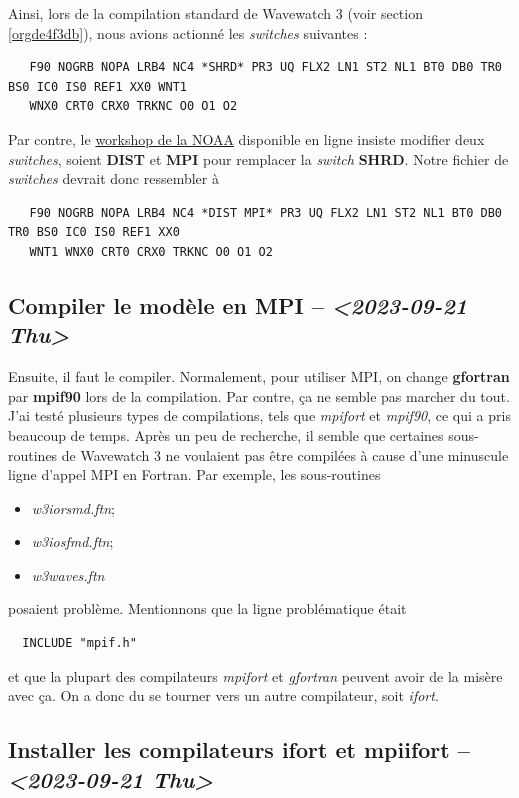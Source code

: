 \documentclass[10pt]{report}
\numberwithin{equation}{section}
\begin{document}
Ainsi, lors de la compilation standard de Wavewatch 3 (voir section \ref{orgde4f3db}), nous avions actionné les \emph{switches} suivantes : 
\begin{verbatim}
   F90 NOGRB NOPA LRB4 NC4 *SHRD* PR3 UQ FLX2 LN1 ST2 NL1 BT0 DB0 TR0 BS0 IC0 IS0 REF1 XX0 WNT1
   WNX0 CRT0 CRX0 TRKNC O0 O1 O2
\end{verbatim}

Par contre, le \href{https://polar.ncep.noaa.gov/waves/workshop/pdfs/WW3-workshop-exercises-day4-MPI.pdf}{workshop de la NOAA} disponible en ligne insiste modifier deux \emph{switches}, soient \textbf{DIST} et \textbf{MPI} pour remplacer la \emph{switch} \textbf{SHRD}.
Notre fichier de \emph{switches} devrait donc ressembler à
\begin{verbatim}
   F90 NOGRB NOPA LRB4 NC4 *DIST MPI* PR3 UQ FLX2 LN1 ST2 NL1 BT0 DB0 TR0 BS0 IC0 IS0 REF1 XX0
   WNT1 WNX0 CRT0 CRX0 TRKNC O0 O1 O2
\end{verbatim}

\subsection{Compiler le modèle en MPI -- \textit{<2023-09-21 Thu>}}
\label{sec:org5ef9cb0}
Ensuite, il faut le compiler.
Normalement, pour utiliser MPI, on change \textbf{gfortran} par \textbf{mpif90} lors de la compilation.
Par contre, ça ne semble pas marcher du tout.
J'ai testé plusieurs types de compilations, tels que \emph{mpifort} et \emph{mpif90}, ce qui a pris beaucoup de temps.
Après un peu de recherche, il semble que certaines sous-routines de Wavewatch 3 ne voulaient pas être compilées à cause d'une minuscule ligne d'appel MPI en Fortran.
Par exemple, les sous-routines
\begin{itemize}
\item \emph{w3iorsmd.ftn};
\item \emph{w3iosfmd.ftn};
\item \emph{w3waves.ftn}
\end{itemize}
posaient problème.
Mentionnons que la ligne problématique était
\begin{verbatim}
  INCLUDE "mpif.h"
\end{verbatim}
et que la plupart des compilateurs \emph{mpifort} et \emph{gfortran} peuvent avoir de la misère avec ça.
On a donc du se tourner vers un autre compilateur, soit \emph{ifort}. 


\subsection{Installer les compilateurs ifort et mpiifort -- \textit{<2023-09-21 Thu>}}
\label{sec:orgf390f41}
\end{document}
